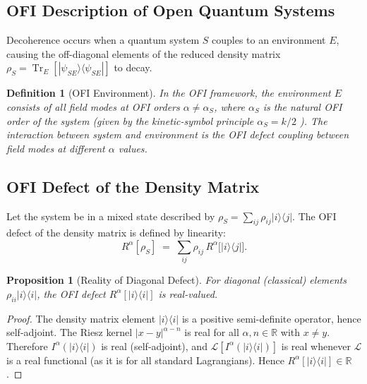 \documentclass[12pt]{article}
\newtheorem{proposition}[theorem]{Proposition}
\newtheorem{definition}[theorem]{Definition}
\theoremstyle{definition}
\newcommand{\R}{\mathbb{R}}
\newcommand{\Tr}{\operatorname{Tr}}
\begin{document}
\subsection{OFI Description of Open Quantum Systems}

Decoherence occurs when a quantum system $S$ couples to an environment $E$,
causing the off-diagonal elements of the reduced density matrix
$\rho_S = \Tr_E[|\psi_{SE}\rangle\langle\psi_{SE}|]$ to decay.

\begin{definition}[OFI Environment]
In the OFI framework, the environment $E$ consists of all field modes
at OFI orders $\alpha \neq \alpha_S$, where $\alpha_S$ is the natural
OFI order of the system (given by the kinetic-symbol principle
$\alpha_S = k/2$ \cite{OFI_ND}).  The interaction between system
and environment is the OFI defect coupling between field modes at
different $\alpha$ values.
\end{definition}

\subsection{OFI Defect of the Density Matrix}

Let the system be in a mixed state described by
$\rho_S = \sum_{ij} \rho_{ij} |i\rangle\langle j|$.
The OFI defect of the density matrix is defined by linearity:
\begin{equation}
  R^\alpha[\rho_S]
  \;=\;
  \sum_{ij} \rho_{ij}\, R^\alpha\bigl[|i\rangle\langle j|\bigr].
  \label{eq:rho-defect}
\end{equation}

\begin{proposition}[Reality of Diagonal Defect]
\label{prop:diagonal}
For diagonal (classical) elements $\rho_{ii} |i\rangle\langle i|$,
the OFI defect $R^\alpha[|i\rangle\langle i|]$ is real-valued.
\end{proposition}

\begin{proof}
The density matrix element $|i\rangle\langle i|$ is a positive
semi-definite operator, hence self-adjoint.  The Riesz kernel
$|x-y|^{\alpha-n}$ is real for all $\alpha, n \in \R$ with $x \neq y$.
Therefore $I^\alpha(|i\rangle\langle i|)$ is real (self-adjoint), and
$\mathcal{L}[I^\alpha(|i\rangle\langle i|)]$ is real whenever
$\mathcal{L}$ is a real functional (as it is for all standard
Lagrangians).  Hence $R^\alpha[|i\rangle\langle i|] \in \R$.
\end{proof}
\end{document}
